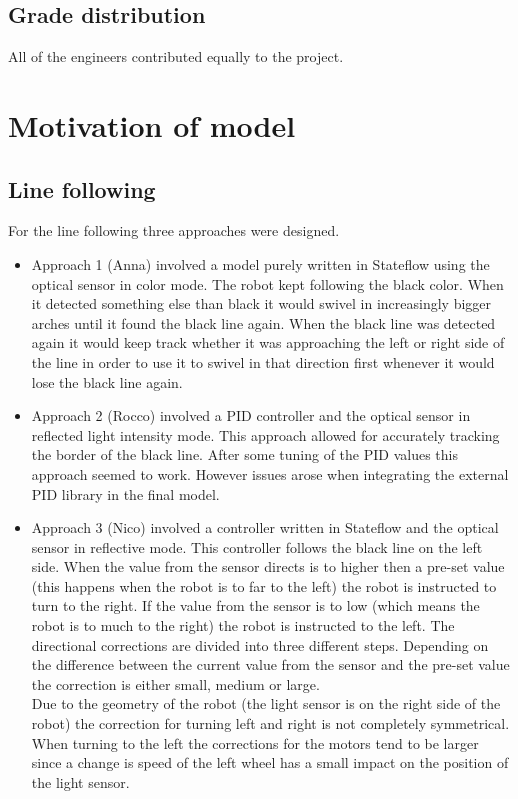 \documentclass[a4paper,12pt]{article}
\begin{document}
\subsection{Grade distribution}
All of the engineers contributed equally to the project. 
\section{Motivation of model}
\subsection{Line following}
For the line following three approaches were designed. 
\begin{itemize}
    \item Approach 1 (Anna) involved a model purely written in Stateflow using the optical sensor in color mode. The robot kept following the black color. When it detected something else than black it would swivel in increasingly bigger arches until it found the black line again. When the black line was detected again it would keep track whether it was approaching the left or right side of the line in order to use it to swivel in that direction first whenever it would lose the black line again.
    \item Approach 2 (Rocco) involved a PID controller and the optical sensor in reflected light intensity mode. This approach allowed for accurately tracking the border of the black line. After some tuning of the PID values this approach seemed to work. However issues arose when integrating the external PID library in the final model.
    \item Approach 3 (Nico) involved a controller written in Stateflow and the optical sensor in reflective mode. This controller follows the black line on the left side. When the value from the sensor directs is to higher then a pre-set value (this happens when the robot is to far to the left) the robot is instructed to turn to the right. If the value from the sensor is to low (which means the robot is to much to the right) the robot is instructed to the left. The directional corrections are divided into three different steps. Depending on the difference between the current value from the sensor and the pre-set value the correction is either small, medium or large.\\
    Due to the geometry of the robot (the light sensor is on the right side of the robot) the correction for turning left and right is not completely symmetrical. When turning to the left the corrections for the motors tend to be larger since a change is speed of the left wheel has a small impact on the position of the light sensor.
\end{itemize}
\end{document}

